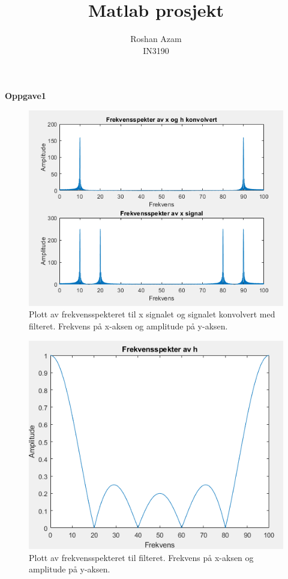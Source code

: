 \documentclass[11pt]{article}
\begin{document}
\title{
  Matlab prosjekt}
\author{\small Roshan Azam\\ IN3190}
\maketitle

\textbf{Oppgave1}

\begin{figure}[H]
\includegraphics[scale=0.9]{1c_xh.png}
\caption{Plott av frekvensspekteret til x signalet og signalet konvolvert med filteret. Frekvens på x-aksen og amplitude på y-aksen. }
\end{figure}

\begin{figure}[H]
\includegraphics[scale=0.9]{1c_hfrek.png}
\caption{Plott av frekvensspekteret til filteret. Frekvens på x-aksen og amplitude på y-aksen.}
\end{figure}
\end{document}
